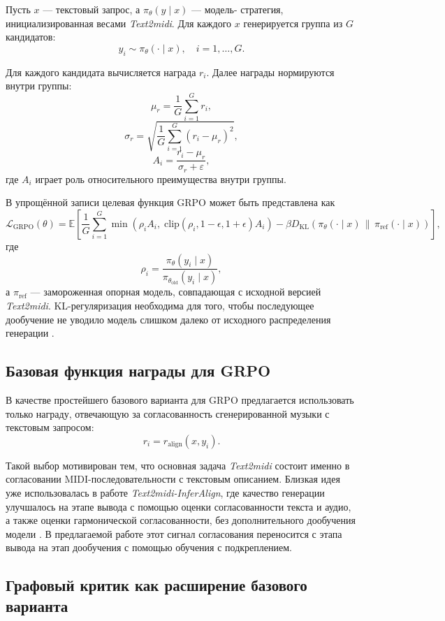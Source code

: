 \documentclass[a4paper,12pt]{extarticle}
\begin{document}
Пусть $x$ --- текстовый запрос, а $\pi_{\theta}(y \mid x)$ --- модель-
стратегия, инициализированная весами \textit{Text2midi}. Для каждого
$x$ генерируется группа из $G$ кандидатов:
$$
y_i \sim \pi_{\theta}(\cdot \mid x), \quad i = 1, \dots, G.
$$

Для каждого кандидата вычисляется награда $r_i$. Далее награды
нормируются внутри группы:
$$
\mu_r = \frac{1}{G}\sum_{i=1}^{G} r_i,
$$
$$
\sigma_r = \sqrt{\frac{1}{G}\sum_{i=1}^{G}(r_i - \mu_r)^2},
$$
$$
A_i = \frac{r_i - \mu_r}{\sigma_r + \varepsilon},
$$
где $A_i$ играет роль относительного преимущества внутри группы.

В упрощённой записи целевая функция GRPO может быть представлена как
$$
\mathcal{L}_{\mathrm{GRPO}}(\theta)
=
\mathbb{E}
\left[
\frac{1}{G}\sum_{i=1}^{G}
\min
\left(
\rho_i A_i,\;
\mathrm{clip}(\rho_i, 1-\epsilon, 1+\epsilon) A_i
\right)
-
\beta D_{\mathrm{KL}}
\left(
\pi_{\theta}(\cdot \mid x)\,\|\,\pi_{\mathrm{ref}}(\cdot \mid x)
\right)
\right],
$$
где
$$
\rho_i =
\frac{\pi_{\theta}(y_i \mid x)}{\pi_{\theta_{\mathrm{old}}}(y_i \mid x)},
$$
а $\pi_{\mathrm{ref}}$ --- замороженная опорная модель, совпадающая с
исходной версией \textit{Text2midi}. KL-регуляризация необходима для того,
чтобы последующее дообучение не уводило модель слишком далеко от
исходного распределения генерации \cite{deepseekmath2024}.

\subsection{Базовая функция награды для GRPO}

В качестве простейшего базового варианта для GRPO предлагается
использовать только награду, отвечающую за согласованность
сгенерированной музыки с текстовым запросом:
$$
r_i = r_{\mathrm{align}}(x, y_i).
$$

Такой выбор мотивирован тем, что основная задача \textit{Text2midi}
состоит именно в согласовании MIDI-последовательности с текстовым
описанием. Близкая идея уже использовалась в работе
\textit{Text2midi-InferAlign}, где качество генерации улучшалось на этапе
вывода с помощью оценки согласованности текста и аудио, а также оценки
гармонической согласованности, без дополнительного дообучения модели
\cite{text2midiinferalign2025}. В предлагаемой работе этот сигнал
согласования переносится с этапа вывода на этап дообучения с помощью
обучения с подкреплением.

\subsection{Графовый критик как расширение базового варианта}
\end{document}
